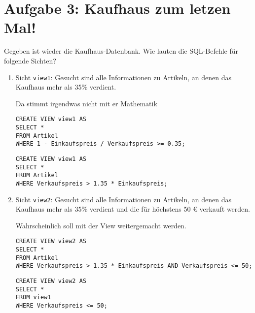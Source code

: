 \documentclass{lehramt-informatik}
\begin{document}
\section{Aufgabe 3: Kaufhaus zum letzen Mal!}

Gegeben ist wieder die Kaufhaus-Datenbank. Wie lauten die SQL-Befehle
für folgende Sichten?

\begin{enumerate}


\item Sicht \verb|view1|: Gesucht sind alle Informationen zu Artikeln,
an denen das Kaufhaus mehr als 35\% verdient.

\begin{antwort}[falsch]
Da stimmt irgendwas nicht mit er Mathematik
\begin{verbatim}
CREATE VIEW view1 AS
SELECT *
FROM Artikel
WHERE 1 - Einkaufspreis / Verkaufspreis >= 0.35;
\end{verbatim}
\end{antwort}

\begin{antwort}[muster]
\begin{verbatim}
CREATE VIEW view1 AS
SELECT *
FROM Artikel
WHERE Verkaufspreis > 1.35 * Einkaufspreis;
\end{verbatim}
\end{antwort}


\item Sicht \verb|view2|: Gesucht sind alle Informationen zu Artikeln,
an denen das Kaufhaus mehr als 35\% verdient und die für höchstens 50 €
verkauft werden.

\begin{antwort}[richtig]
Wahrscheinlich soll mit der View weitergemacht werden.
\begin{verbatim}
CREATE VIEW view2 AS
SELECT *
FROM Artikel
WHERE Verkaufspreis > 1.35 * Einkaufspreis AND Verkaufspreis <= 50;
\end{verbatim}
\end{antwort}

\begin{antwort}[muster]
\begin{verbatim}
CREATE VIEW view2 AS
SELECT *
FROM view1
WHERE Verkaufspreis <= 50;
\end{verbatim}
\end{antwort}
\end{enumerate}
\end{document}
